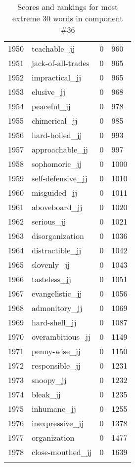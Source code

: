 \begin{longtable}[!htbp]{| rlr@{.}l |}
    1950 & teachable\_jj & 0 & 960 \\
    1951 & jack-of-all-trades & 0 & 965 \\
    1952 & impractical\_jj & 0 & 965 \\
    1953 & elusive\_jj & 0 & 968 \\
    1954 & peaceful\_jj & 0 & 978 \\
    1955 & chimerical\_jj & 0 & 985 \\
    1956 & hard-boiled\_jj & 0 & 993 \\
    1957 & approachable\_jj & 0 & 997 \\
    1958 & sophomoric\_jj & 0 & 1000 \\
    1959 & self-defensive\_jj & 0 & 1010 \\
    1960 & misguided\_jj & 0 & 1011 \\
    1961 & aboveboard\_jj & 0 & 1020 \\
    1962 & serious\_jj & 0 & 1021 \\
    1963 & disorganization & 0 & 1036 \\
    1964 & distractible\_jj & 0 & 1042 \\
    1965 & slovenly\_jj & 0 & 1043 \\
    1966 & tasteless\_jj & 0 & 1051 \\
    1967 & evangelistic\_jj & 0 & 1056 \\
    1968 & admonitory\_jj & 0 & 1069 \\
    1969 & hard-shell\_jj & 0 & 1087 \\
    1970 & overambitious\_jj & 0 & 1149 \\
    1971 & penny-wise\_jj & 0 & 1150 \\
    1972 & responsible\_jj & 0 & 1231 \\
    1973 & snoopy\_jj & 0 & 1232 \\
    1974 & bleak\_jj & 0 & 1235 \\
    1975 & inhumane\_jj & 0 & 1255 \\
    1976 & inexpressive\_jj & 0 & 1378 \\
    1977 & organization & 0 & 1477 \\
    1978 & close-mouthed\_jj & 0 & 1639 \\
    \hline
    \caption{Scores and rankings for most extreme 30 words in component \#36} \\
\end{longtable}
